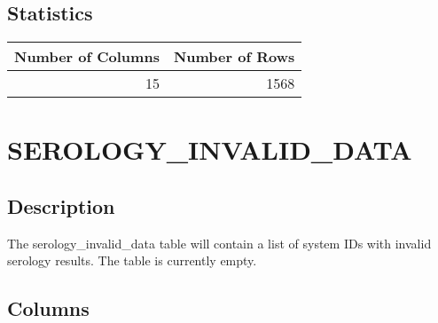 \documentclass[
  letterpaper,
  DIV=11,
  numbers=noendperiod]{scrreprt}
\begin{document}
\hypertarget{statistics-36}{%
\section*{Statistics}\label{statistics-36}}

\begin{longtable}{rr}
\toprule
Number of Columns & Number of Rows \\ 
\midrule
15 & 1568 \\ 
\bottomrule
\end{longtable}

\hypertarget{serology_invalid_data}{%
\chapter*{SEROLOGY\_INVALID\_DATA}\label{serology_invalid_data}}

\hypertarget{description-37}{%
\section*{Description}\label{description-37}}

The serology\_invalid\_data table will contain a list of system IDs with
invalid serology results. The table is currently empty.

\hypertarget{columns-37}{%
\section*{Columns}\label{columns-37}}
\end{document}
